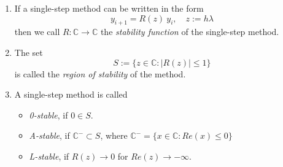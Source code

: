 		\begin{definition}
			\begin{enumerate}
				\item 
				If a single-step method can be written in the form
				\begin{equation}
					y_{i+1} = R(z) \ y_i, \quad z:= h \lambda
				\end{equation}
				then we call $R: \mathbb{C} \to \mathbb{C}$ the \emph{stability function} of the single-step method.
				\item 
				The set
				\begin{equation}
					S := \{z \in \mathbb{C} : |R(z)| \leq 1\}
				\end{equation}
				is called the \emph{region of stability} of the method.
				\item 
				A single-step method is called
				\begin{itemize}
					\item \emph{0-stable}, if $0 \in S$.
					\item \emph{A-stable}, if $\mathbb{C}^- \subset S$, where $\mathbb{C}^- = \{x \in \mathbb{C} : Re(x) \leq 0 \}$
					\item \emph{L-stable}, if $R(z) \to 0$ for $Re(z) \to -\infty$.
				\end{itemize}
			\end{enumerate}
		\end{definition}

		
		
		

